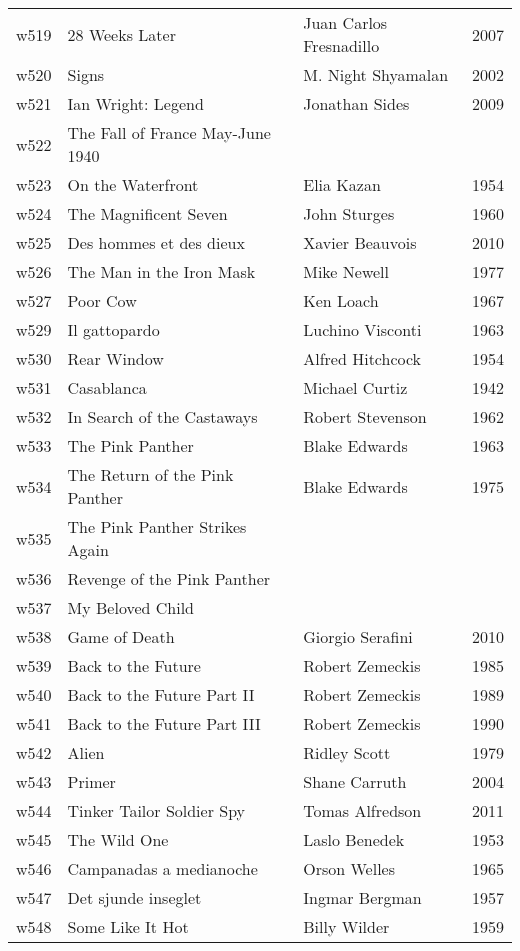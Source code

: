 \documentclass{article}
\begin{document}
\begin {center}
\begin{longtable}{l p{10cm} l l}
w519 & 28 Weeks Later & Juan Carlos Fresnadillo & 2007 \\
w520 & Signs & M. Night Shyamalan & 2002 \\
w521 & Ian Wright: Legend & Jonathan Sides & 2009 \\
w522 & The Fall of France May-June 1940 &  &  \\
w523 & On the Waterfront & Elia Kazan & 1954 \\
w524 & The Magnificent Seven & John Sturges & 1960 \\
w525 & Des hommes et des dieux & Xavier Beauvois & 2010 \\
w526 & The Man in the Iron Mask & Mike Newell & 1977 \\
w527 & Poor Cow & Ken Loach & 1967 \\
w529 & Il gattopardo & Luchino Visconti & 1963 \\
w530 & Rear Window & Alfred Hitchcock & 1954 \\
w531 & Casablanca & Michael Curtiz & 1942 \\
w532 & In Search of the Castaways & Robert Stevenson & 1962 \\
w533 & The Pink Panther & Blake Edwards & 1963 \\
w534 & The Return of the Pink Panther & Blake Edwards & 1975 \\
w535 & The Pink Panther Strikes Again &  &  \\
w536 & Revenge of the Pink Panther &  &  \\
w537 & My Beloved Child &  &  \\
w538 & Game of Death & Giorgio Serafini & 2010 \\
w539 & Back to the Future & Robert Zemeckis & 1985 \\
w540 & Back to the Future Part II & Robert Zemeckis & 1989 \\
w541 & Back to the Future Part III & Robert Zemeckis & 1990 \\
w542 & Alien & Ridley Scott & 1979 \\
w543 & Primer & Shane Carruth & 2004 \\
w544 & Tinker Tailor Soldier Spy & Tomas Alfredson & 2011 \\
w545 & The Wild One & Laslo Benedek & 1953 \\
w546 & Campanadas a medianoche & Orson Welles & 1965 \\
w547 & Det sjunde inseglet & Ingmar Bergman & 1957 \\
w548 & Some Like It Hot & Billy Wilder & 1959 \\

\end{longtable}
\end{center}
\end{document}
